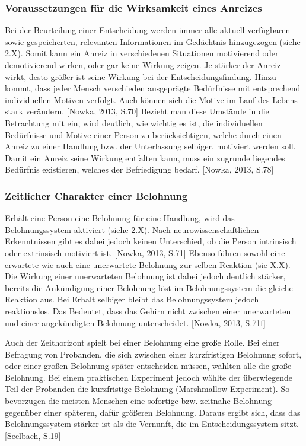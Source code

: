 \subsubsection{Voraussetzungen für die Wirksamkeit eines Anreizes}
Bei der Beurteilung einer Entscheidung werden immer alle aktuell verfügbaren sowie gespeicherten, relevanten Informationen im Gedächtnis hinzugezogen (siehe 2.X). Somit kann ein Anreiz in verschiedenen Situationen motivierend oder demotivierend wirken, oder gar keine Wirkung zeigen. Je stärker der Anreiz wirkt, desto größer ist seine Wirkung bei der Entscheidungsfindung. Hinzu kommt, dass jeder Mensch verschieden ausgeprägte Bedürfnisse mit entsprechend individuellen Motiven verfolgt. Auch können sich die Motive im Lauf des Lebens stark verändern. [Nowka, 2013, S.70]
Bezieht man diese Umstände in die Betrachtung mit ein, wird deutlich, wie wichtig es ist, die individuellen Bedürfnisse und Motive einer Person zu berücksichtigen, welche durch einen Anreiz zu einer Handlung bzw. der Unterlassung selbiger, motiviert werden soll. Damit ein Anreiz seine Wirkung entfalten kann, muss ein zugrunde liegendes Bedürfnis existieren, welches der Befriedigung bedarf. [Nowka, 2013, S.78]

\subsubsection{Zeitlicher Charakter einer Belohnung}
Erhält eine Person eine Belohnung für eine Handlung, wird das Belohnungssystem aktiviert (siehe 2.X). Nach neurowissenschaftlichen Erkenntnissen gibt es dabei jedoch keinen Unterschied, ob die Person intrinsisch oder extrinsisch motiviert ist. [Nowka, 2013, S.71]
Ebenso führen sowohl eine erwartete wie auch eine unerwartete Belohnung zur selben Reaktion (sie X.X). Die Wirkung einer unerwarteten Belohnung ist dabei jedoch deutlich stärker,  bereits die Ankündigung einer Belohnung löst im Belohnungssystem die gleiche Reaktion aus. Bei Erhalt selbiger bleibt das Belohnungssystem jedoch reaktionslos. Das Bedeutet, dass das Gehirn nicht zwischen einer unerwarteten und einer angekündigten Belohnung unterscheidet. [Nowka, 2013, S.71f]
 
Auch der Zeithorizont spielt bei einer Belohnung eine große Rolle. Bei einer Befragung von Probanden, die sich zwischen einer kurzfristigen Belohnung sofort, oder einer großen Belohnung später entscheiden müssen, wählten alle die große Belohnung. Bei einem praktischen Experiment jedoch wählte der überwiegende Teil der Probanden die kurzfristige Belohnung (Marshmallow-Experiment). So bevorzugen die meisten Menschen eine sofortige bzw. zeitnahe Belohnung gegenüber einer späteren, dafür größeren Belohnung. Daraus ergibt sich, dass das Belohnungssystem stärker ist als die Vernunft, die im Entscheidungssystem sitzt. [Seelbach, S.19]

